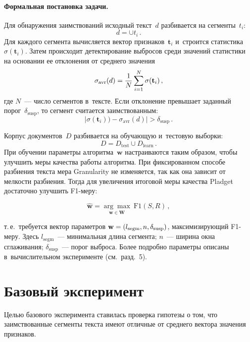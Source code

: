 \begin{multicols}{2}
\paragraph*{Формальная постановка задачи.}
Для обнаружения заимствований исходный текст~$d$ разбивается на сегменты~$t_i$:
$$
d=\cup t_i\,.
$$
Для каждого сегмента вычисляется вектор признаков~$\mathbf{t}_i$ и~строится 
статистика~$\sigma(\mathbf{t}_i)$.
Затем происходит детектирование выбросов среди значений статистики на основании 
ее отклонения от среднего значения $$
\sigma_{\mathrm{avr}}(d) = 
\displaystyle\frac{\displaystyle 1\mathstrut}{\displaystyle N\mathstrut}\sum\limits_{i=1}^N \sigma(\mathbf{t}_i)\,,
$$
 где $N$~--- число 
сегментов в~тексте. Если отклонение превышает заданный порог~$\delta_{\mathrm{susp}}$, то 
сегмент считается заимствованным:
$$
\left\vert \sigma(\mathbf{t}_i))-\sigma_{\mathrm{avr}}(d)\right\vert > \delta_{\mathrm{susp}}\,.
$$

Корпус документов~$D$ разбивается на обуча\-ющую и~тестовую выборки: 
$$
D=D_{\mathrm{test}}\cup D_{\mathrm{learn}}\,.
$$
При обучении параметры алгоритма~$\mathbf{w}$ настраиваются таким образом, чтобы 
улучшить меры качества работы алгоритма. При фиксированном способе разбиения 
текста мера {Granularity} не изменяется, так как она зависит от мелкости 
разбиения. Тогда для увеличения итоговой меры качества {Pladget} достаточно 
улучшить {F1-меру}:

\vspace*{-2pt}

\noindent
$$
\hat{\mathbf{w}}= \underset{\mathbf{w} \in \mathbf{W}}{\arg\max}\ \mathrm{F}1(S,  R)\,, 
$$

\vspace*{-2pt}

\noindent
т.\,е.\ требуется вектор параметров $\mathbf{w} \hm= (l_{\mathrm{segm}}, 
n, \delta_{\mathrm{susp}})$, 
максимизирующий {F1-меру}.
Здесь $l_{\mathrm{segm}}$~--- минимальная длина сегмента; $n$~--- ширина окна 
сглаживания; $\delta_{\mathrm{susp}}$~--- порог выброса.
 Более подробно параметры описаны 
в~вычислительном эксперименте (см.\ разд.~5).



\section{Базовый эксперимент}

Целью базового эксперимента ставилась проверка гипотезы о том, что 
заимствованные сегменты текста имеют отличные от среднего вектора значения 
признаков.


\end{multicols}

